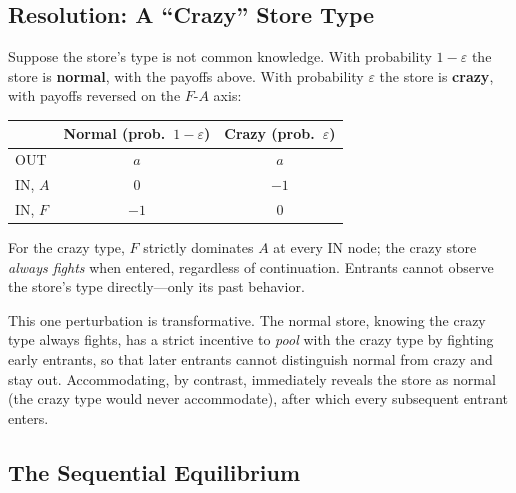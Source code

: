 
\subsection{Resolution: A ``Crazy'' Store Type}

Suppose the store's type is not common knowledge. With probability $1 - \varepsilon$ the store is \textbf{normal}, with the payoffs above. With probability $\varepsilon$ the store is \textbf{crazy}, with payoffs reversed on the $F$-$A$ axis:

\begin{center}
\begin{tabular}{lcc}
  \hline
   & \textbf{Normal} (prob.\ $1 - \varepsilon$) & \textbf{Crazy} (prob.\ $\varepsilon$) \\
  \hline
  OUT     & $a$  & $a$  \\
  IN, $A$ & $0$  & $-1$ \\
  IN, $F$ & $-1$ & $0$  \\
  \hline
\end{tabular}
\end{center}

For the crazy type, $F$ strictly dominates $A$ at every IN node; the crazy store \emph{always fights} when entered, regardless of continuation. Entrants cannot observe the store's type directly---only its past behavior.

This one perturbation is transformative. The normal store, knowing the crazy type always fights, has a strict incentive to \emph{pool} with the crazy type by fighting early entrants, so that later entrants cannot distinguish normal from crazy and stay out. Accommodating, by contrast, immediately reveals the store as normal (the crazy type would never accommodate), after which every subsequent entrant enters.

\subsection{The Sequential Equilibrium}

